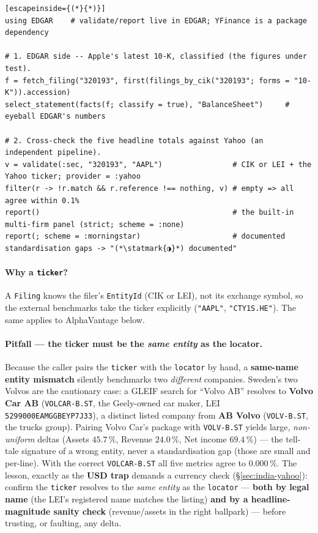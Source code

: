 \documentclass[11pt,a4paper]{report}
\newcommand{\statmark}[1]{{\symbolfont #1}}
\begin{document}
\begin{lstlisting}[escapeinside={(*}{*)}]
using EDGAR    # validate/report live in EDGAR; YFinance is a package dependency

# 1. EDGAR side -- Apple's latest 10-K, classified (the figures under test).
f = fetch_filing("320193", first(filings_by_cik("320193"; forms = "10-K")).accession)
select_statement(facts(f; classify = true), "BalanceSheet")     # eyeball EDGAR's numbers

# 2. Cross-check the five headline totals against Yahoo (an independent pipeline).
v = validate(:sec, "320193", "AAPL")                # CIK or LEI + the Yahoo ticker; provider = :yahoo
filter(r -> !r.match && r.reference !== nothing, v) # empty => all agree within 0.1%
report()                                            # the built-in multi-firm panel (strict; scheme = :none)
report(; scheme = :morningstar)                     # documented standardisation gaps -> "(*\statmark{◑}*) documented"
\end{lstlisting}

\paragraph{Why a \texttt{ticker}?} A \texttt{Filing} knows the filer's \texttt{EntityId} (CIK or LEI),
not its exchange symbol, so the external benchmarks take the ticker explicitly (\texttt{"AAPL"},
\texttt{"CTY1S.HE"}). The same applies to AlphaVantage below.

\paragraph{Pitfall --- the ticker must be the \emph{same entity} as the locator.} Because the caller pairs
the \texttt{ticker} with the \texttt{locator} by hand, a \textbf{same-name entity mismatch} silently
benchmarks two \emph{different} companies. Sweden's two Volvos are the cautionary case: a GLEIF search for
``Volvo AB'' resolves to \textbf{Volvo Car AB} (\texttt{VOLCAR-B.ST}, the Geely-owned car maker, LEI
\texttt{5299000EAMGGBEYP7J33}), a distinct listed company from \textbf{AB Volvo} (\texttt{VOLV-B.ST}, the
trucks group). Pairing Volvo Car's package with \texttt{VOLV-B.ST} yields large, \emph{non-uniform} deltas
(Assets $45.7\,\%$, Revenue $24.0\,\%$, Net income $69.4\,\%$) --- the tell-tale signature of a wrong entity,
never a standardisation gap (those are small and per-line). With the correct \texttt{VOLCAR-B.ST} all five
metrics agree to $0.000\,\%$. The lesson, exactly as the \textbf{USD trap} demands a currency check
(\S\ref{sec:india-yahoo}): confirm the \texttt{ticker} resolves to the \emph{same entity} as the
\texttt{locator} --- \textbf{both by legal name} (the LEI's registered name matches the listing) \textbf{and
by a headline-magnitude sanity check} (revenue/assets in the right ballpark) --- before trusting, or
faulting, any delta.
\end{document}
